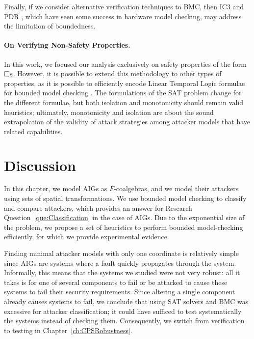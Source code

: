 Finally, if we consider alternative verification techniques to BMC, then IC3 \cite{IC3,IC32} and PDR \cite{IC3}, which have seen some success in hardware model checking, may address the limitation of boundedness.

\paragraph{On Verifying Non-Safety Properties.} In this work, we focused our analysis exclusively on safety properties of the form ${{\square}} e$. However, it is possible to extend this methodology to other types of properties, as it is possible to efficiently encode Linear Temporal Logic formulae for bounded model checking \cite{BMCWithoutBDDs,lmcs:2236}. The formulations of the SAT problem change for the different formulae, but both isolation and monotonicity should remain valid heuristics; ultimately, monotonicity and isolation are about the sound extrapolation of the validity of attack strategies among attacker models that have related capabilities.

\section{Discussion}
\label{sec:Classification:Summary}
In this chapter, we model AIGs as $F$-coalgebras, and we model their attackers using sets of spatial transformations. We use bounded model checking to classify and compare attackers, which provides an answer for Research Question~\ref{que:Classification} in the case of AIGs. Due to the exponential size of the problem, we propose a set of heuristics to perform bounded model-checking efficiently, for which we provide experimental evidence. 


Finding minimal attacker models with only one coordinate is relatively simple since AIGs are systems where a fault quickly propagates through the system. Informally, this means that the systems we studied were not very robust: all it takes is for one of several components to fail or be attacked to cause these systems to fail their security requirements. Since altering a single component already causes systems to fail, we conclude that using SAT solvers and BMC was excessive for attacker classification; it could have sufficed to test systematically the systems instead of checking them. Consequently, we switch from verification to testing in Chapter~\ref{ch:CPSRobustness}. 

